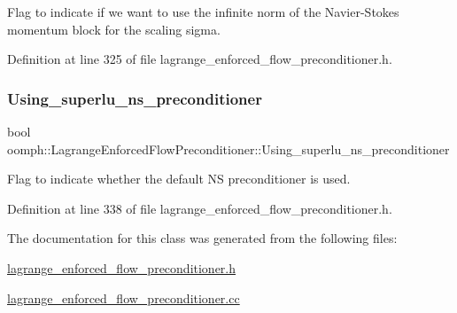 Flag to indicate if we want to use the infinite norm of the Navier-\/\+Stokes momentum block for the scaling sigma. 



Definition at line 325 of file lagrange\+\_\+enforced\+\_\+flow\+\_\+preconditioner.\+h.

\mbox{\label{classoomph_1_1LagrangeEnforcedFlowPreconditioner_ab447b9d1830e1b470e090efa13201844}} 
\subsubsection{\texorpdfstring{Using\+\_\+superlu\+\_\+ns\+\_\+preconditioner}{Using\_superlu\_ns\_preconditioner}}
{\footnotesize\ttfamily bool oomph\+::\+Lagrange\+Enforced\+Flow\+Preconditioner\+::\+Using\+\_\+superlu\+\_\+ns\+\_\+preconditioner\hspace{0.3cm}{\ttfamily [private]}}



Flag to indicate whether the default NS preconditioner is used. 



Definition at line 338 of file lagrange\+\_\+enforced\+\_\+flow\+\_\+preconditioner.\+h.



The documentation for this class was generated from the following files\+:\begin{DoxyCompactItemize}
\item 
\hyperlink{lagrange__enforced__flow__preconditioner_8h}{lagrange\+\_\+enforced\+\_\+flow\+\_\+preconditioner.\+h}\item 
\hyperlink{lagrange__enforced__flow__preconditioner_8cc}{lagrange\+\_\+enforced\+\_\+flow\+\_\+preconditioner.\+cc}\end{DoxyCompactItemize}
